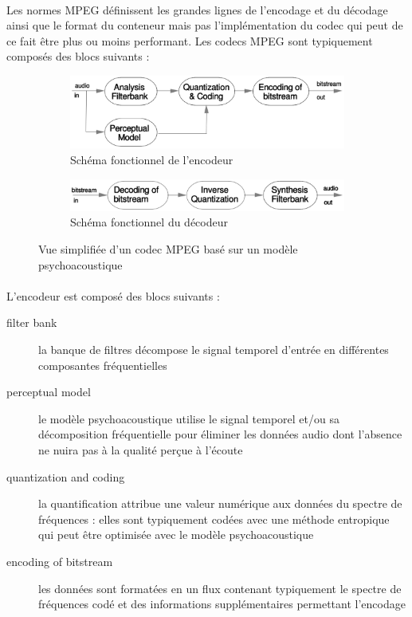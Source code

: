 \documentclass{article}
\begin{document}
    \paragraph{}
    Les normes MPEG définissent les grandes lignes de l'encodage et du décodage ainsi que le format du conteneur mais pas l'implémentation du codec qui peut de ce fait être plus ou moins performant. Les codecs MPEG sont typiquement composés des blocs suivants\cite{1999-Brandenburg} :
    \begin{figure}[H]
        \centering
        \begin{subfigure}[b]{.6\linewidth}
            \includegraphics[width=\linewidth]{./images/1999-Brandenburg-simple-AAC-encoder.png}
            \caption{Schéma fonctionnel de l'encodeur}
        \end{subfigure}
        \begin{subfigure}[b]{.6\linewidth}
            \includegraphics[width=\linewidth]{./images/1999-Brandenburg-simple-AAC-decoder.png}
            \caption{Schéma fonctionnel du décodeur}
        \end{subfigure}
        \caption{Vue simplifiée d'un codec MPEG basé sur un modèle psychoacoustique}
    \end{figure}
    \paragraph{}
    L'encodeur est composé des blocs suivants :
    \begin{description}
        \item[filter bank] la banque de filtres décompose le signal temporel d'entrée en différentes composantes fréquentielles
        \item[perceptual model] le modèle psychoacoustique utilise le signal temporel et/ou sa décomposition fréquentielle pour éliminer les données audio dont l'absence ne nuira pas à la qualité perçue à l'écoute
        \item[quantization and coding] la quantification attribue une valeur numérique aux données du spectre de fréquences : elles sont typiquement codées avec une méthode entropique qui peut être optimisée avec le modèle psychoacoustique
        \item[encoding of bitstream] les données sont formatées en un flux contenant typiquement le spectre de fréquences codé et des informations supplémentaires permettant l'encodage
    \end{description}
    
\end{document}
